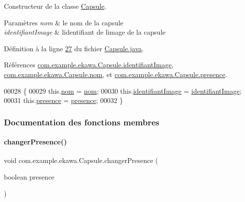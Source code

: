Constructeur de la classe \hyperlink{classcom_1_1example_1_1ekawa_1_1_capsule}{Capsule}. 


\begin{DoxyParams}{Paramètres}
{\em nom} & le nom de la capsule \\
\hline
{\em identifiant\+Image} & l\textquotesingle{}identifiant de l\textquotesingle{}image de la capsule \\
\hline
\end{DoxyParams}


Définition à la ligne \hyperlink{_capsule_8java_source_l00027}{27} du fichier \hyperlink{_capsule_8java_source}{Capsule.\+java}.



Références \hyperlink{_capsule_8java_source_l00019}{com.\+example.\+ekawa.\+Capsule.\+identifiant\+Image}, \hyperlink{_capsule_8java_source_l00018}{com.\+example.\+ekawa.\+Capsule.\+nom}, et \hyperlink{_capsule_8java_source_l00020}{com.\+example.\+ekawa.\+Capsule.\+presence}.


\begin{DoxyCode}
00028     \{
00029         this.\hyperlink{classcom_1_1example_1_1ekawa_1_1_capsule_a936a082e9bcfdda4bb8fbffd33665cb0}{nom} = \hyperlink{classcom_1_1example_1_1ekawa_1_1_capsule_a936a082e9bcfdda4bb8fbffd33665cb0}{nom};
00030         this.\hyperlink{classcom_1_1example_1_1ekawa_1_1_capsule_a05fa50e416ea3a48d6b8dab73174c9d0}{identifiantImage} = \hyperlink{classcom_1_1example_1_1ekawa_1_1_capsule_a05fa50e416ea3a48d6b8dab73174c9d0}{identifiantImage};
00031         this.\hyperlink{classcom_1_1example_1_1ekawa_1_1_capsule_a351ef1f4b4258f4651d24b206fc38a94}{presence} = \hyperlink{classcom_1_1example_1_1ekawa_1_1_capsule_a351ef1f4b4258f4651d24b206fc38a94}{presence};
00032     \}
\end{DoxyCode}


\subsubsection{Documentation des fonctions membres}
\mbox{\label{classcom_1_1example_1_1ekawa_1_1_capsule_ad9c3e6efb116092fc0dfc26cf8ea6c2f}} 
\paragraph{\texorpdfstring{changer\+Presence()}{changerPresence()}}
{\footnotesize\ttfamily void com.\+example.\+ekawa.\+Capsule.\+changer\+Presence (\begin{DoxyParamCaption}\item[{boolean}]{presence }\end{DoxyParamCaption})}



